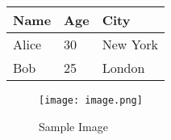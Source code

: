 \documentclass{article}
\begin{document}
\begin{tabular}{|l|l|l|}
\hline
Name & Age & City \\ \hline
Alice & 30 & New York \\ \hline
Bob & 25 & London \\ \hline
\end{tabular}

\begin{figure}[h]
\centering
\texttt{[image: image.png]}
\caption{Sample Image}
\end{figure}
\end{document}
